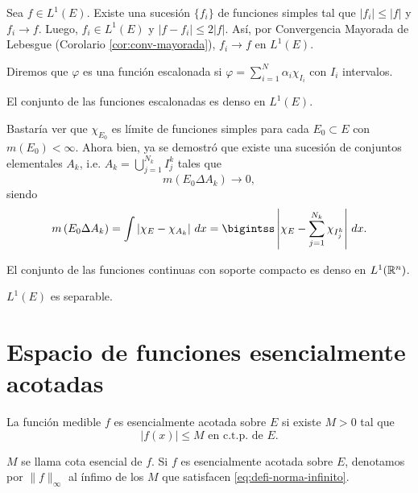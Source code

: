 \begin{demo}
Sea $f\in L^1(E)$. Existe una sucesi\'on $\{f_i\}$ de funciones simples tal que $|f_i|\leq |f|$ y $f_i \to f$. Luego, $f_i \in L^1(E)$ y $|f-f_i|\leq 2|f|$. As\'i, por  Convergencia Mayorada de Lebesgue (Corolario \ref{cor:conv-mayorada}), $f_i \to f$ en $L^1(E)$.
\end{demo}

\begin{definicion}{}
Diremos que $\varphi$ es una funci\'on escalonada si 
$\varphi=\sum\limits_{i=1}^N \alpha_i \chi_{I_i}$
con $I_i$ intervalos.
\end{definicion}

\begin{teorema}{}
El conjunto de las funciones escalonadas es denso en $L^1(E)$.
\end{teorema}

\begin{demo}
Bastar\'ia ver que $\chi_{E_0}$ es l\'imite de funciones simples para cada $E_0\subset E$ con $m(E_0)<\infty$.
Ahora bien, ya se demostr\'o que existe una sucesi\'on  de conjuntos elementales $A_k$, i.e. $A_k=\bigcup\limits_{j=1}^{N_k} I_j^k$ tales que 
\[
m\left(E_0\Delta A_k\right) \to 0,
\]
siendo
\[
m\left(E_0\Delta A_k\right)=
\int \left|\chi_E-\chi_{A_k}\right|\,dx=
\bigintss \left|
\chi_E-\sum\limits_{j=1}^{N_k} \chi_{I_j^k}
\right|\,dx.
\]
\end{demo}

\begin{ejercicio}{}
El conjunto de las funciones continuas con soporte compacto es denso en $L^1(\mathbb{R}^n)$.
\end{ejercicio}

\begin{ejercicio}{}
$L^1(E)$ es separable.
\end{ejercicio}

\section{Espacio de funciones esencialmente acotadas}

La función medible $f$ es esencialmente acotada sobre $E$ si existe $M>0$ tal que
\begin{equation}\label{eq:defi-norma-infinito}
|f(x)|\leq M \mbox { en c.t.p. de  } E.
\end{equation}

$M$ se llama cota esencial de $f$.  Si $f$ es esencialmente acotada sobre $E$, denotamos por $\|f\|_{\infty}$ al \'infimo de los $M$ que satisfacen \eqref{eq:defi-norma-infinito}.

